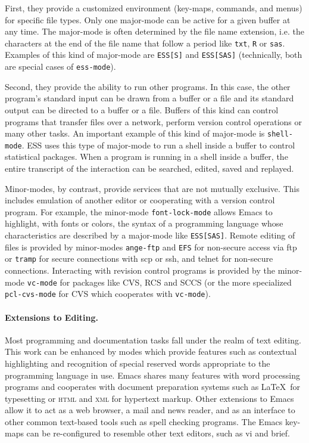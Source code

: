 \documentclass{article}
\newcommand{\stexttt}[1]{{\small\texttt{#1}}}
\begin{document}
First, they provide a customized environment (key-maps, commands, and menus) 
for specific file types.  Only 
one major-mode can be active for a given buffer at any time.  The major-mode 
is often determined by the file name extension, i.e. the characters at the 
end of the file name that follow a period like \stexttt{txt}, \stexttt{R} or
\stexttt{sas}.  Examples of this kind of major-mode are \stexttt{ESS[S]} and 
\stexttt{ESS[SAS]} (technically, both are special cases of \stexttt{ess-mode}).

Second, they provide the ability to run other programs.
In this case, the other program's standard input can be drawn from a buffer
or a file and its standard output can be directed to a buffer or a
file.  Buffers of this kind can control programs that transfer files
over a network, perform version control operations or many other
tasks.  An important example of this kind of major-mode is
\stexttt{shell-mode}.  ESS uses this type of major-mode to run a shell
inside a buffer to control statistical packages.  When a program is running 
in a shell inside a buffer, the entire transcript of the interaction can 
be searched, edited, saved and replayed.

Minor-modes, by contrast, provide services that are not mutually
exclusive.  This includes emulation of another editor or cooperating
with a version control program.  For example, the minor-mode
\stexttt{font-lock-mode} allows Emacs to highlight, with fonts or
colors, the syntax of a programming language whose characteristics are
described by a major-mode like \stexttt{ESS[SAS]}.  Remote editing of files is
provided by minor-modes \stexttt{ange-ftp} and \stexttt{EFS} for
non-secure access via ftp or \stexttt{tramp} for secure connections
with scp or ssh, and telnet for non-secure connections.
Interacting with revision control programs is provided by the minor-mode 
\stexttt{vc-mode} for packages like CVS, RCS and SCCS (or the more
specialized \stexttt{pcl-cvs-mode} for CVS which cooperates with 
\stexttt{vc-mode}).

\paragraph{Extensions to Editing.}
Most programming and documentation tasks fall under the realm of text
editing.  This work can be enhanced by modes which provide features such
as contextual highlighting and recognition of special reserved words
appropriate to the programming language in use.  
Emacs shares many features with word processing
programs and cooperates with document preparation systems
such as \LaTeX\ for typesetting or \textsc{html} and \textsc{xml}
for hypertext markup.  Other extensions to Emacs allow it to act as a 
web browser, a mail and news reader, and as an interface to
other common text-based tools such as spell checking programs.  The
Emacs key-maps can be re-configured to resemble other text editors, 
such as vi and brief.
\end{document}
